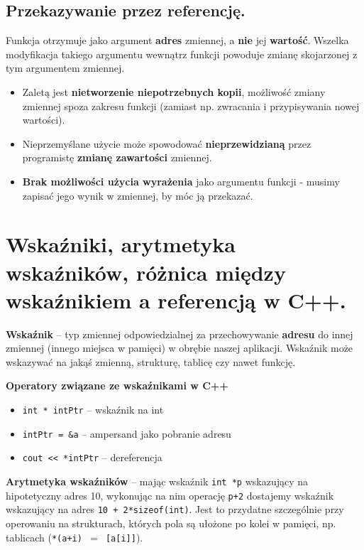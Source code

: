 \documentclass[main.tex]{subfiles}
\begin{document}
    \subsection{Przekazywanie przez referencję.}
    Funkcja otrzymuje jako argument \textbf{adres} zmiennej, a \textbf{nie} jej \textbf{wartość}. Wszelka modyfikacja takiego argumentu wewnątrz funkcji powoduje zmianę skojarzonej
    z tym argumentem zmiennej.
    \begin{itemize}
        \item Zaletą jest \textbf{nietworzenie niepotrzebnych kopii}, możliwość zmiany zmiennej spoza zakresu funkcji (zamiast
        np. zwracania i przypisywania nowej wartości).
        \item Nieprzemyślane użycie może spowodować \textbf{nieprzewidzianą} przez programistę \textbf{zmianę zawartości} zmiennej.
        \item \textbf{Brak możliwości użycia wyrażenia} jako argumentu funkcji - musimy zapisać jego wynik w zmiennej, by móc
        ją przekazać.
    \end{itemize}


    \section{Wskaźniki, arytmetyka wskaźników, różnica między wskaźnikiem a referencją w C++.}
    \textbf{Wskaźnik} – typ zmiennej odpowiedzialnej za przechowywanie \textbf{adresu} do innej zmiennej
    (innego miejsca w pamięci) w obrębie naszej aplikacji.
    Wskaźnik może wskazywać na jakąś zmienną, strukturę, tablicę czy nawet funkcję.

    \noindent\textbf{Operatory związane ze wskaźnikami w C++}

    \begin{itemize}[noitemsep]
        \item \texttt{int * intPtr} -- wskaźnik na int
        \item \texttt{intPtr = \&a} -- ampersand jako pobranie adresu
        \item \texttt{cout << *intPtr} -- dereferencja
    \end{itemize}

    \noindent \textbf{Arytmetyka wskaźników} --
    mając wskaźnik \texttt{int *p} wskazujący na hipotetyczny adres 10, wykonując na nim operację \texttt{p+2}
    dostajemy wskaźnik wskazujący na adres \texttt{10 + 2*sizeof(int)}.
    Jest to przydatne szczególnie przy operowaniu na strukturach, których pola są ułożone po kolei w pamięci, np. tablicach
    (\texttt{*(a+i) $=$ \texttt[a[i]]}).\\
\end{document}
